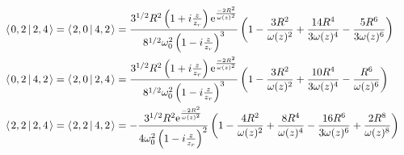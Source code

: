 \documentclass[11pt]{amsart}
\makeatletter
\newcommand{\e}{{\rm e}}				%
\newcommand{\msp}[1]{\mspace{#1mu}}		%
\newcommand{\0}{\varnothing}		%
\newcommand{\brac}[2]{\left\langle\msp{2} #1\left\lvert \msp{3.5} #2 \right.\right\rangle}	%
\newcommand{\1}{!}
\newcommand{\2}{@}
\newcommand{\3}{\#}
\newcommand{\4}{\$}
\newcommand{\5}{\%}
\newcommand{\6}{$^\wedge$}
\newcommand{\7}{\&}
\newcommand{\8}{*}
\newcommand{\9}{(}
\makeatother
\begin{document}
\begin{align*}
\\
&
\brac{0,2}{2,4} = \brac{2,0}{4,2} = \frac{3^{1/2}R^2\left(1+i\frac{z}{z_r}\right)\e^{\frac{-2R^2}{\omega(z)^2}}}{8^{1/2}\omega_0^2\left(1-i\frac{z}{z_r}\right)^3}\left(1-\frac{3R^2}{\omega(z)^2}+\frac{14R^4}{3\omega(z)^4}-\frac{5R^6}{3\omega(z)^6}\right)
\\
&
\brac{0,2}{4,2} = \brac{2,0}{2,4} = \frac{3^{1/2}R^2\left(1+i\frac{z}{z_r}\right)\e^{\frac{-2R^2}{\omega(z)^2}}}{8^{1/2}\omega_0^2\left(1-i\frac{z}{z_r}\right)^3}\left(1-\frac{3R^2}{\omega(z)^2}+\frac{10R^4}{3\omega(z)^4}-\frac{R^6}{\omega(z)^6}\right)
\\
&
\brac{2,2}{2,4} = \brac{2,2}{4,2}=-\frac{3^{1/2}R^2\e^{\frac{-2R^2}{\omega(z)^2}}}{4\omega_0^2\left(1-i\frac{z}{z_r}\right)^2}\left(1-\frac{4R^2}{\omega(z)^2}+\frac{8R^4}{\omega(z)^4}-\frac{16R^6}{3\omega(z)^6}+\frac{2R^8}{\omega(z)^8}\right)
\end{align*}
\end{document}
